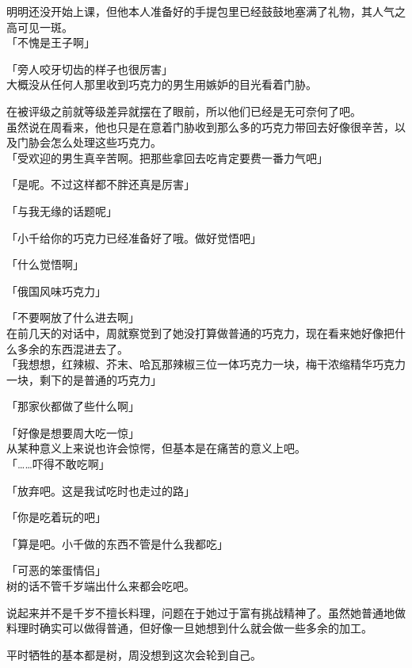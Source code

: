 明明还没开始上课，但他本人准备好的手提包里已经鼓鼓地塞满了礼物，其人气之高可见一斑。\\

「不愧是王子啊」

「旁人咬牙切齿的样子也很厉害」\\

大概没从任何人那里收到巧克力的男生用嫉妒的目光看着门胁。

在被评级之前就等级差异就摆在了眼前，所以他们已经是无可奈何了吧。\\

虽然说在周看来，他也只是在意着门胁收到那么多的巧克力带回去好像很辛苦，以及门胁会怎么处理这些巧克力。\\

「受欢迎的男生真辛苦啊。把那些拿回去吃肯定要费一番力气吧」

「是呢。不过这样都不胖还真是厉害」

「与我无缘的话题呢」

「小千给你的巧克力已经准备好了哦。做好觉悟吧」

「什么觉悟啊」

「俄国风味巧克力」

「不要啊放了什么进去啊」\\

在前几天的对话中，周就察觉到了她没打算做普通的巧克力，现在看来她好像把什么多余的东西混进去了。\\

「我想想，红辣椒、芥末、哈瓦那辣椒三位一体巧克力一块，梅干浓缩精华巧克力一块，剩下的是普通的巧克力」

「那家伙都做了些什么啊」

「好像是想要周大吃一惊」\\

从某种意义上来说也许会惊愕，但基本是在痛苦的意义上吧。\\

「……吓得不敢吃啊」

「放弃吧。这是我试吃时也走过的路」

「你是吃着玩的吧」

「算是吧。小千做的东西不管是什么我都吃」

「可恶的笨蛋情侣」\\

树的话不管千岁端出什么来都会吃吧。

说起来并不是千岁不擅长料理，问题在于她过于富有挑战精神了。虽然她普通地做料理时确实可以做得普通，但好像一旦她想到什么就会做一些多余的加工。

平时牺牲的基本都是树，周没想到这次会轮到自己。\\

